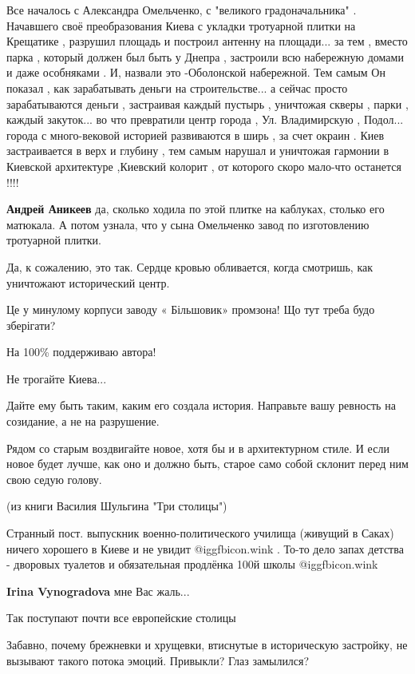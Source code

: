 \begin{itemize}

Все началось с Александра Омельченко, с "великого градоначальника" . Начавшего
своё преобразования Киева с укладки тротуарной плитки на Крещатике , разрушил
площадь и построил антенну на площади... за тем , вместо парка , который должен
был быть у Днепра , застроили всю набережную домами и даже особняками . И,
назвали это -Оболонской набережной. Тем самым Он показал , как зарабатывать
деньги на строительстве... а сейчас просто зарабатываются деньги , застраивая
каждый пустырь , уничтожая скверы , парки , каждый закуток... во что превратили
центр города , Ул. Владимирскую , Подол... города с много-вековой историей
развиваются в ширь , за счет окраин . Киев застраивается в верх и глубину , тем
самым нарушал и уничтожая гармонии в Киевской архитектуре ,Киевский колорит ,
от которого скоро мало-что останется !!!!

\begin{itemize} %
\textbf{Андрей Аникеев} да, сколько ходила по этой плитке на каблуках, столько его матюкала. А потом узнала, что у сына Омельченко завод по изготовлению тротуарной плитки.
\end{itemize} %

Да, к сожалению, это так. Сердце кровью обливается, когда смотришь, как уничтожают исторический центр.

Це у минулому корпуси заводу « Більшовик» промзона! Що тут треба будо зберігати?

На 100\% поддерживаю автора!


Не трогайте Киева...

Дайте ему быть таким, каким его создала история. Направьте вашу ревность на
созидание, а не на разрушение.

Рядом со старым воздвигайте новое, хотя бы и в архитектурном стиле. И если
новое будет лучше, как оно и должно быть, старое само собой склонит перед ним
свою седую голову.

(из книги Василия Шульгина "Три столицы")


Странный пост. выпускник военно-политического училища (живущий в Саках) ничего
хорошего в Киеве и не увидит @igg{fbicon.wink} . То-то дело запах детства - дворовых туалетов и
обязательная продлёнка 100й школы @igg{fbicon.wink} 

\begin{itemize} %
\textbf{Irina Vynogradova} мне Вас жаль...
\end{itemize} %

Так поступают почти все европейские столицы

Забавно, почему брежневки и хрущевки, втиснутые в историческую застройку, не
вызывают такого потока эмоций. Привыкли? Глаз замылился?

\end{itemize} %
